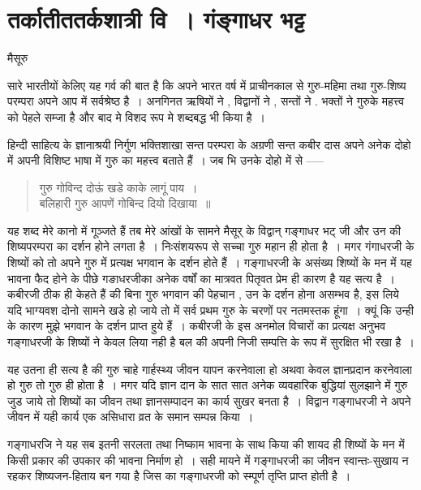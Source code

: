 {\fontsize{15}{17}\selectfont
\presetvalues
\chapter{तर्कातीततर्कशात्री वि~। गंङ्गाधर भट्ट}

\begin{center}
\smallskip
मैसूरु
\addrule
\end{center}
सारे भारतीयों केलिए यह गर्व की बात है कि अपने भारत वर्ष में प्राचीनकाल से गुरु-महिमा तथा गुरु-शिष्य परम्परा अपने आप में सर्वश्रेष्ठ है~। अनगिनत ऋषियों ने , विद्वानों ने , सन्तों ने . भक्तों ने गुरुके महत्त्व को पेहले सम्जा है और बाद मे विशद रूप मे शब्दबद्ध भी किया है~। 

हिन्दी साहित्य के ज्ञानाश्रयी निर्गुण भक्तिशाखा सन्त परम्परा के अग्रणी सन्त कबीर दास अपने अनेक दोहो में अपनी विशिष्ट भाषा में गुरु का महत्त्व बताते हैं~। जब भि उनके दोहो में से ----- 
\begin{verse}
गुरु गोविन्द दोऊं खडे काके लागूं पाय~।\\	
बलिहारी गुरु आपणें गोबिन्द दियो दिखाया~॥
\end{verse}
यह शब्द मेरे कानो में गूञ्जते हैं तब मेरे आंखों के सामने मैसूर् के विद्वान् गङ्गाधर भट् जी और उन की शिष्यपरम्परा का दर्शन होने लगता है~। निःसंशयरूप से सच्चा गुरु महान ही होता है~। मगर गंगाधरजी के शिष्यों को तो अपने गुरु में प्रत्यक्ष भगवान के दर्शन होते हैं~। गङ्गाधरजी के असंख्य शिष्यों के मन में यह भावना फैद होने के पीछे गङाधरजीका अनेक वर्षों का मात्रवत पितृवत प्रेम ही कारण है यह सत्य है~। कबीरजी ठीक ही केहते हैं की बिना गुरु भगवान की पेहचान , उन के दर्शन होना असम्भव है, इस लिये यदि भाग्यवश दोनो सामने खडे हो जाये तो में सर्व  प्रथम गुरु के चरणों पर नतमस्तक हूंगा~। क्यूं कि उन्ही के कारण मुझे भगवान के दर्शन प्राप्त हुये हैं~। कबीरजी के इस अनमोल विचारों का प्रत्यक्ष अनुभव गङ्गाधरजी के शिष्यों ने केवल लिया नही है बल की अपनी निजी सम्पत्ति के रूप में सुरक्षित भी रखा है~। 

यह उतना ही सत्य है की गुरु चाहे गार्हस्थ्य जीवन यापन करनेवाला हो अथवा केवल ज्ञानप्रदान करनेवाला हो गुरु तो गुरु ही होता है~। मगर यदि ज्ञान दान के सात सात अनेक व्यवहारिक बुद्धियां सुलझाने में गुरु जुड जाये तो शिष्यों का जीवन तथा ज्ञानसम्पादन का कार्य सुखर बनता है~। विद्वान गङ्गाधरजी ने अपने जीवन में यही कार्य एक असिधारा व्रत के समान सम्पन्न किया~। 

गङ्गाधरजि ने यह सब इतनी सरलता तथा निष्काम भावना के साथ किया की शायद ही शिष्यों के मन में किसी प्रकार की उपकार की भावना निर्माण हो~। सही मायने में गङ्गाधरजी का जीवन स्वान्तः-सुखाय न रहकर शिष्यजन-हिताय बन गया है जिस का गङ्गाधरजी को स्म्पूर्ण तृप्ति प्राप्त होती है~।

}
